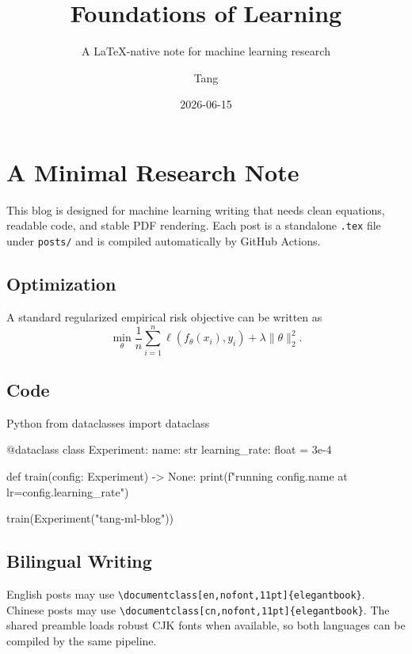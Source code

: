 \documentclass[en,nofont,11pt]{elegantbook}
\title{Foundations of Learning}
\subtitle{A LaTeX-native note for machine learning research}
\author{Tang}
\institute{Tang's Machine Learning Blog}
\date{2026-06-15}
\begin{document}
\maketitle
\frontmatter
\tableofcontents
\mainmatter

\chapter{A Minimal Research Note}

This blog is designed for machine learning writing that needs clean equations, readable code, and stable PDF rendering. Each post is a standalone \verb|.tex| file under \verb|posts/| and is compiled automatically by GitHub Actions.

\section{Optimization}

A standard regularized empirical risk objective can be written as
\[
  \min_{\theta} \frac{1}{n}\sum_{i=1}^{n}\ell(f_{\theta}(x_i), y_i)
  + \lambda\|\theta\|_2^2.
\]

\section{Code}

\begin{codeblock}{Python}
from dataclasses import dataclass

@dataclass
class Experiment:
    name: str
    learning_rate: float = 3e-4

def train(config: Experiment) -> None:
    print(f"running {config.name} at lr={config.learning_rate}")

train(Experiment("tang-ml-blog"))
\end{codeblock}

\section{Bilingual Writing}

English posts may use \verb|\documentclass[en,nofont,11pt]{elegantbook}|. Chinese posts may use \verb|\documentclass[cn,nofont,11pt]{elegantbook}|. The shared preamble loads robust CJK fonts when available, so both languages can be compiled by the same pipeline.
\end{document}
